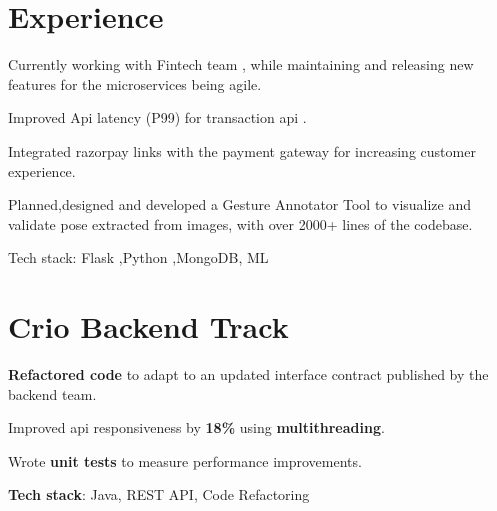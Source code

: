 \documentclass[]{deedy-resume-openfont}
\begin{document}
\begin{minipage}[t]{0.66\textwidth} 


\section{Experience}

\sectionsep

\sectionsep
{}
\vspace{\topsep} %
\begin{tightemize}
\item Currently working with Fintech team , while maintaining and releasing new features for the microservices being agile.
\item Improved Api latency (P99) for transaction api .
\item Integrated razorpay links with the payment gateway for increasing customer experience.
\end{tightemize}

\sectionsep

\sectionsep
{}
\vspace{\topsep} %
\begin{tightemize}\item Planned,designed and developed a Gesture Annotator Tool to visualize and
validate pose extracted from  images, with over 2000+ lines of the codebase.
\item Tech stack: Flask ,Python ,MongoDB, ML
\end{tightemize}


\sectionsep


\section{Crio Backend Track}


\begin{tightemize}
\item \textbf{Refactored code} to adapt to an updated interface contract published by the backend team.
\item Improved api responsiveness by \textbf{18\%} using \textbf{multithreading}.
\item Wrote \textbf{unit tests} to measure performance improvements.
\item \textbf{Tech stack}: Java, REST API, Code Refactoring
\end{tightemize}


\end{minipage}
\end{document}
